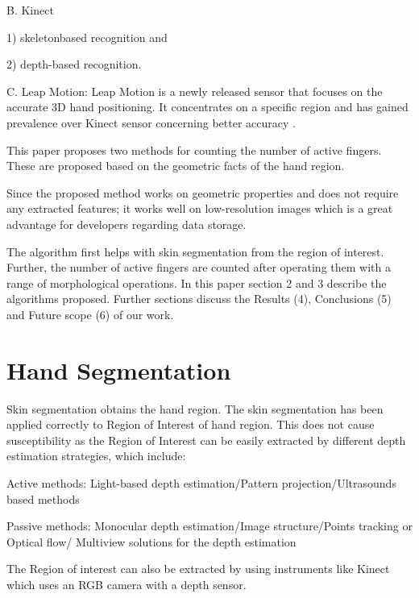 \documentclass[conference]{IEEEtran}
\begin{document}
B. Kinect

 1) skeletonbased recognition \cite{shotton2013real} and 
 
 2) depth-based recognition.

C. Leap Motion: Leap Motion is a newly released sensor that focuses on the accurate 3D hand positioning. It concentrates on a specific region and has gained prevalence over Kinect sensor concerning better accuracy \cite{regenbrecht2013leap}.

This paper proposes two methods for counting the number of active fingers. These are proposed based on the geometric facts of the hand region. 

Since the proposed method works on geometric properties and does not require any extracted features; it works well on low-resolution images which is a great advantage for developers regarding data storage.

The algorithm first helps with skin segmentation from the region of interest. Further, the number of active fingers are counted after operating them with a range of morphological operations.
In this paper section 2 and 3 describe the algorithms proposed. Further sections discuss the Results (4), Conclusions (5) and Future scope (6) of our work.




\section{Hand Segmentation}

Skin segmentation obtains the hand region. The skin segmentation has been applied correctly to Region of Interest of hand region. This does not cause susceptibility as the Region of Interest can be easily extracted by different depth estimation strategies, which include:

Active methods:
Light-based depth estimation/Pattern projection/Ultrasounds based methods

Passive methods:
Monocular depth estimation/Image structure/Points tracking or Optical flow/ Multiview solutions for the depth estimation

The Region of interest can also be extracted by using instruments like Kinect which uses an RGB camera with a depth sensor.
\end{document}
